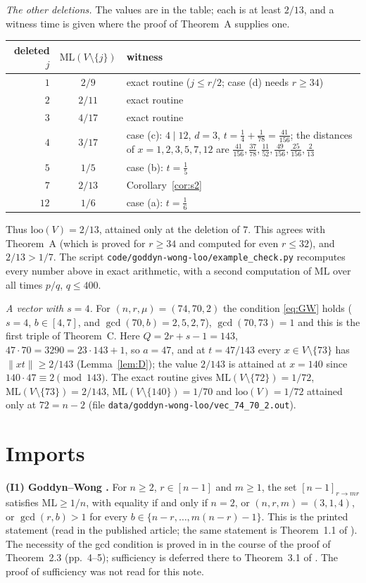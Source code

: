 \documentclass[11pt]{article}
\theoremstyle{remark}
\newcommand{\norm}[1]{\lVert #1\rVert}
\newcommand{\ML}{\mathrm{ML}}
\newcommand{\loo}{\mathrm{loo}}
\begin{document}
\emph{The other deletions.} The values are in the table; each is at least $2/13$, and a witness time is given where the proof of Theorem~A supplies one.
\begin{center}\small
\begin{tabular}{@{}rcL{8.6cm}@{}}
\toprule
deleted $j$ & $\ML(V\setminus\{j\})$ & witness\\
\midrule
$1$ & $2/9$ & exact routine ($j\le r/2$; case (d) needs $r\ge34$)\\
$2$ & $2/11$ & exact routine\\
$3$ & $4/17$ & exact routine\\
$4$ & $3/17$ & case (c): $4\mid12$, $d=3$, $t=\tfrac14+\tfrac1{78}=\tfrac{41}{156}$; the distances of $x=1,2,3,5,7,12$ are $\tfrac{41}{156},\tfrac{37}{78},\tfrac{11}{52},\tfrac{49}{156},\tfrac{25}{156},\tfrac2{13}$\\
$5$ & $1/5$ & case (b): $t=\tfrac15$\\
$7$ & $2/13$ & Corollary~\ref{cor:s2}\\
$12$ & $1/6$ & case (a): $t=\tfrac16$\\
\bottomrule
\end{tabular}
\end{center}
Thus $\loo(V)=2/13$, attained only at the deletion of $7$. This agrees with Theorem~A (which is proved for $r\ge34$ and computed for even $r\le32$), and $2/13>1/7$. The script \texttt{code/goddyn-wong-loo/example\_check.py} recomputes every number above in exact arithmetic, with a second computation of $\ML$ over all times $p/q$, $q\le400$.

\emph{A vector with $s=4$.} For $(n,r,\mu)=(74,70,2)$ the condition \eqref{eq:GW} holds ($s=4$, $b\in[4,7]$, and $\gcd(70,b)=2,5,2,7$), $\gcd(70,73)=1$ and this is the first triple of Theorem~C. Here $Q=2r+s-1=143$, $47\cdot70=3290=23\cdot143+1$, so $a=47$, and at $t=47/143$ every $x\in V\setminus\{73\}$ has $\norm{xt}\ge2/143$ (Lemma~\ref{lem:D}); the value $2/143$ is attained at $x=140$ since $140\cdot47\equiv2\pmod{143}$. The exact routine gives $\ML(V\setminus\{72\})=1/72$, $\ML(V\setminus\{73\})=2/143$, $\ML(V\setminus\{140\})=1/70$ and $\loo(V)=1/72$ attained only at $72=n-2$ (file \texttt{data/goddyn-wong-loo/vec\_74\_70\_2.out}).

\section{Imports}\label{sec:imports}

\textbf{(I1) Goddyn--Wong \cite[Theorem~2.3, p.~4]{GW06}.} For $n\ge2$, $r\in[n-1]$ and $m\ge1$, the set $[n-1]_{r\to mr}$ satisfies $\ML\ge1/n$, with equality if and only if $n=2$, or $(n,r,m)=(3,1,4)$, or $\gcd(r,b)>1$ for every $b\in\{n-r,\dots,m(n-r)-1\}$. This is the printed statement (read in the published article; the same statement is Theorem~1.1 of \cite{Zhang26}). The necessity of the gcd condition is proved in \cite{GW06} in the course of the proof of Theorem~2.3 (pp.~4--5); sufficiency is deferred there to Theorem~3.1 of \cite{GW06}. The proof of sufficiency was not read for this note.
\end{document}

